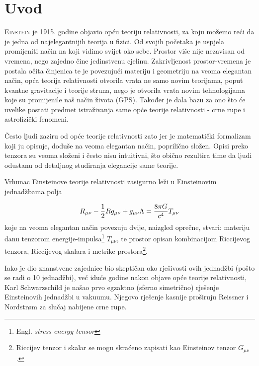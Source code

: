 \chapter{Uvod}

\lettrine[lines=4]{E} {instein} je 1915. godine objavio opću teoriju relativnosti, za koju možemo reći da je jedna od najelegantnijih teorija u fizici. Od svojih početaka je uspjela promijeniti način na koji vidimo svijet oko sebe. Prostor više nije nezavisan od vremena, nego zajedno čine jedinstvenu cjelinu. Zakrivljenost prostor-vremena je postala očita činjenica te je povezujući materiju i geometriju na veoma elegantan način, opća teorija relativnosti otvorila vrata ne samo novim teorijama, poput kvantne gravitacije i teorije struna, nego je otvorila vrata novim tehnologijama koje su promijenile naš način života (GPS). Također je dala bazu za ono što će uvelike postati predmet istraživanja same opće teorije relativnosti - crne rupe i astrofizički fenomeni.

Često ljudi zaziru od opće teorije relativnosti zato jer je matematički formalizam koji ju opisuje, doduše na veoma elegantan način, poprilično složen. Opisi preko tenzora su veoma složeni i često nisu intuitivni, što obično rezultira time da ljudi odustanu od detaljnog studiranja elegancije same teorije.

\newpage

Vrhunac Einsteinove teorije relativnosti zasigurno leži u Einsteinovim jednadžbama polja

\begin{equation}
R_{\mu\nu}-\frac{1}{2}Rg_{\mu\nu}+g_{\mu\nu}\Lambda=\frac{8\pi G}{c^4}T_{\mu\nu}
\label{eq:EinsteinFeildEq}
\medskip
\end{equation}
%
koje na veoma elegantan način povezuju dvije, naizgled oprečne, stvari: materiju danu tenzorom energije-impulsa\footnote{Engl. \textit{stress energy tensor}} $T_{\mu\nu}$, te prostor opisan kombinacijom Riccijevog tenzora, Riccijevog skalara i metrike prostora\footnote{Riccijev tenzor i skalar se mogu skraćeno zapisati kao Einsteinov tenzor $G_{\mu\nu}$.}.

Iako je dio znanstvene zajednice bio skeptičan oko rješivosti ovih jednadžbi (pošto se radi o 10 jednadžbi), već iduće godine nakon objave opće teorije relativnosti, Karl Schwarzschild je našao prvo egzaktno (sferno simetrično) rješenje Einsteinovih jednadžbi u vakuumu. Njegovo rješenje kasnije proširuju Reissner i Nordstr\o m za slučaj nabijene crne rupe.

